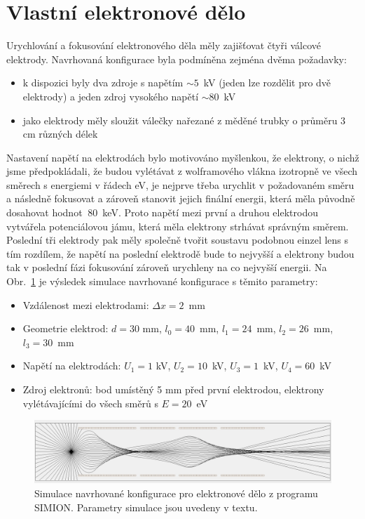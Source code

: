 \section{Vlastní elektronové dělo}

Urychlování a fokusování elektronového děla měly zajišťovat čtyři válcové elektrody. Navrhovaná konfigurace byla podmíněna zejména dvěma požadavky:
\begin{itemize}
	\item k dispozici byly dva zdroje s napětím $\sim 5$~kV (jeden lze rozdělit pro dvě elektrody) a jeden zdroj vysokého napětí $\sim 80$~kV
	\item jako elektrody měly sloužit válečky nařezané z měděné trubky o průměru 3 cm různých délek
\end{itemize}

Nastavení napětí na elektrodách bylo motivováno myšlenkou, že elektrony, o nichž jsme předpokládali, že budou vylétávat z wolframového vlákna izotropně ve všech směrech s energiemi v řádech eV, je nejprve třeba urychlit v požadovaném směru a následně fokusovat a zároveň stanovit jejich finální energii, která měla původně dosahovat hodnot $~80$~keV. Proto napětí mezi první a druhou elektrodou vytvářela potenciálovou jámu, která měla elektrony strhávat správným směrem. Poslední tři elektrody pak měly společně tvořit soustavu podobnou einzel lens s tím rozdílem, že napětí na poslední elektrodě bude to nejvyšší a elektrony budou tak v poslední fázi fokusování zároveň urychleny na co nejvyšší energii. Na Obr.~\ref{05simulaceVlastniDelo} je výsledek simulace navrhované konfigurace s těmito parametry:
\begin{itemize}
	\item Vzdálenost mezi elektrodami: $\Delta x = 2$~mm
	\item Geometrie elektrod: $d = 30$ mm, $l_0 = 40$~mm, $l_1 = 24$~mm, $l_2 = 26$~mm, $l_3 = 30$~mm
	\item Napětí na elektrodách: $U_1 = 1$ kV, $U_2 = 10$~kV, $U_3 = 1$~kV, $U_4 = 60$~kV
	\item Zdroj elektronů: bod umístěný 5 mm před první elektrodou, elektrony vylétávajícími do všech směrů s $E = 20$~eV
\end{itemize}

\begin{figure}[htbp!]
\centering
\includegraphics[width = 366 pt]{Figure/05/2a.jpg}
\caption{Simulace navrhované konfigurace pro elektronové dělo z programu SIMION. Parametry simulace jsou uvedeny v textu.}
\label{05simulaceVlastniDelo}
\end{figure}

